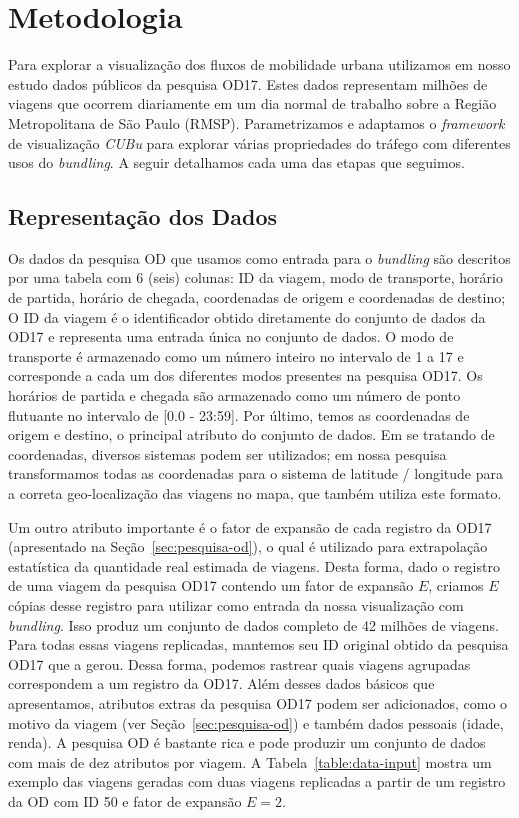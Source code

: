 \chapter{Metodologia}
\label{cap:metodologia}

Para explorar a visualização dos fluxos de mobilidade urbana utilizamos em nosso
estudo dados públicos da pesquisa OD17. Estes dados representam milhões de viagens
que ocorrem diariamente em um dia normal de trabalho sobre a Região Metropolitana
de São Paulo (RMSP). Parametrizamos e adaptamos o \emph{framework} de visualização \emph{CUBu} para explorar várias
propriedades do tráfego com diferentes usos do \emph{bundling}. A seguir
detalhamos cada uma das etapas que seguimos.

\section{Representação dos Dados}

Os dados da pesquisa OD que usamos como entrada para o \emph{bundling} são
descritos por uma tabela com 6 (seis) colunas: ID da viagem, modo de transporte,
horário de partida, horário de chegada, coordenadas de origem e coordenadas de
destino; O ID da viagem é o identificador obtido
diretamente do conjunto de dados da OD17 e representa uma entrada única no conjunto
de dados. O modo de transporte é armazenado como um número inteiro no intervalo
de 1 a 17 e corresponde a cada um dos diferentes modos presentes na pesquisa OD17.
Os horários de partida e chegada são armazenado como um número de ponto
flutuante no intervalo de [0.0 - 23:59]. Por último, temos as coordenadas de
origem e destino, o principal atributo do conjunto de dados. Em se tratando de
coordenadas, diversos sistemas podem ser utilizados; em nossa pesquisa
transformamos todas as coordenadas para o sistema de latitude / longitude para a
correta geo-localização das viagens no mapa, que também utiliza este formato.

Um outro atributo importante é o fator de expansão de cada registro da OD17 (apresentado na Seção~\ref{sec:pesquisa-od}),
o qual é utilizado para extrapolação estatística da quantidade real estimada de viagens.
Desta forma, dado o registro de uma viagem da pesquisa OD17 contendo um fator de expansão $E$, criamos $E$
cópias desse registro para utilizar como entrada da nossa visualização com \emph{bundling}. Isso produz um conjunto de dados completo de 42
milhões de viagens. Para todas essas viagens replicadas, mantemos seu ID original
obtido da pesquisa OD17 que a gerou. Dessa forma, podemos rastrear quais viagens
agrupadas correspondem a um registro da OD17. Além desses dados básicos que apresentamos, atributos
extras da pesquisa OD17 podem ser adicionados, como o motivo da viagem (ver
Seção~\ref{sec:pesquisa-od}) e também dados pessoais (idade, renda). A pesquisa
OD é bastante rica e pode produzir um conjunto de dados com mais de dez atributos por viagem.
A Tabela~\ref{table:data-input} mostra um exemplo das viagens geradas com duas
viagens replicadas a partir de um registro da OD com ID 50 e fator de expansão $E=2$.


